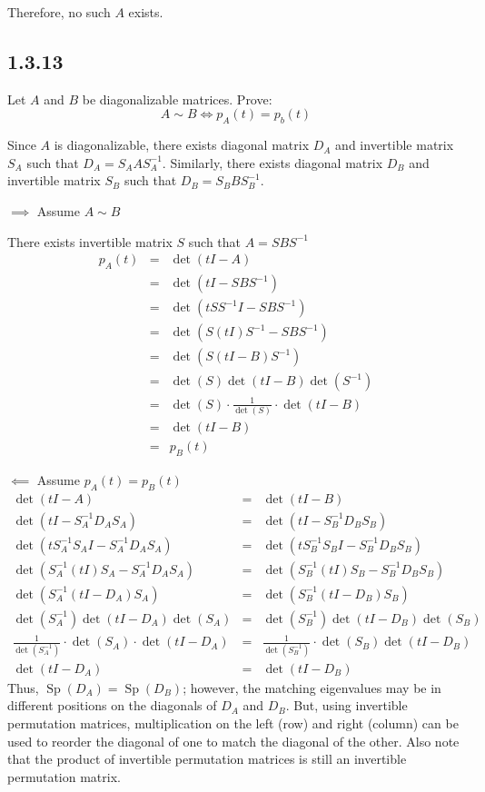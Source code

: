 \documentclass[letterpaper,12pt,fleqn]{article}
\DeclareMathOperator{\Sp}{Sp}
\begin{document}
Therefore, no such $A$ exists.

\subsection*{1.3.13}

Let $A$ and $B$ be diagonalizable matrices. Prove:
\[A\sim B\iff p_A(t)=p_b(t)\]

Since $A$ is diagonalizable, there exists diagonal matrix $D_A$ and
invertible matrix $S_A$ such that $D_A=S_AAS_A^{-1}$. Similarly, there exists
diagonal matrix $D_B$ and invertible matrix $S_B$ such that $D_B=S_BBS_B^{-1}$.

\begin{description}
\item $\implies$ Assume $A\sim B$

  There exists invertible matrix $S$ such that $A=SBS^{-1}$
  \begin{eqnarray*}
    p_A(t) &=& \det(tI-A) \\
    &=& \det(tI-SBS^{-1}) \\
    &=& \det(tSS^{-1}I-SBS^{-1}) \\
    &=& \det(S(tI)S^{-1}-SBS^{-1}) \\
    &=& \det(S(tI-B)S^{-1}) \\
    &=& \det(S)\det(tI-B)\det(S^{-1}) \\
    &=& \det(S)\cdot\frac{1}{\det(S)}\cdot\det(tI-B) \\
    &=& \det(tI-B) \\
    &=& p_B(t)
  \end{eqnarray*}

\item $\impliedby$ Assume $p_A(t)=p_B(t)$
  \begin{eqnarray*}
    \det(tI-A) &=& \det(tI-B) \\
    \det(tI-S_A^{-1}D_AS_A) &=& \det(tI-S_B^{-1}D_BS_B) \\
    \det(tS_A^{-1}S_AI-S_A^{-1}D_AS_A) &=& \det(tS_B^{-1}S_BI-S_B^{-1}D_BS_B) \\
    \det(S_A^{-1}(tI)S_A-S_A^{-1}D_AS_A) &=& \det(S_B^{-1}(tI)S_B-S_B^{-1}D_BS_B) \\
    \det(S_A^{-1}(tI-D_A)S_A) &=& \det(S_B^{-1}(tI-D_B)S_B) \\
    \det(S_A^{-1})\det(tI-D_A)\det(S_A) &=& \det(S_B^{-1})\det(tI-D_B)\det(S_B) \\
    \frac{1}{\det(S_A^{-1})}\cdot\det(S_A)\cdot\det(tI-D_A) &=&
    \frac{1}{\det(S_B^{-1})}\cdot\det(S_B)\det(tI-D_B) \\
    \det(tI-D_A) &=& \det(tI-D_B)
  \end{eqnarray*}
  Thus, $\Sp(D_A)=\Sp(D_B)$; however, the matching eigenvalues may be in
  different positions on the diagonals of $D_A$ and $D_B$. But, using
  invertible permutation matrices, multiplication on the left (row) and
  right (column) can be used to reorder the diagonal of one to match the
  diagonal of the other. Also note that the product of invertible permutation
  matrices is still an invertible permutation matrix.


\end{description}
\end{document}
